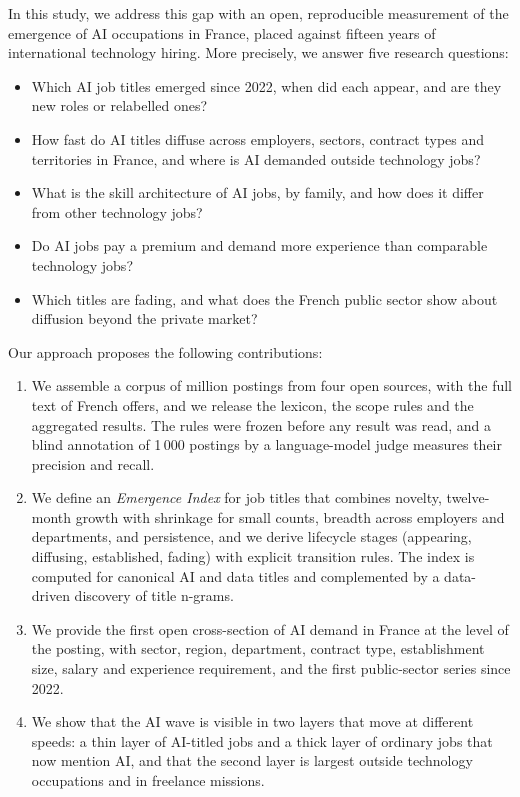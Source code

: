 \documentclass[3p,times,10pt,authoryear]{elsarticle}
\newcommand{\RQ}[1]{\textbf{RQ#1}}
\begin{document}
In this study, we address this gap with an open, reproducible measurement of the emergence of AI occupations in France, placed against fifteen years of international technology hiring. More precisely, we answer five research questions:
\begin{itemize}[leftmargin=2.6em]
\item[\RQ{1}] Which AI job titles emerged since 2022, when did each appear, and are they new roles or relabelled ones?
\item[\RQ{2}] How fast do AI titles diffuse across employers, sectors, contract types and territories in France, and where is AI demanded outside technology jobs?
\item[\RQ{3}] What is the skill architecture of AI jobs, by family, and how does it differ from other technology jobs?
\item[\RQ{4}] Do AI jobs pay a premium and demand more experience than comparable technology jobs?
\item[\RQ{5}] Which titles are fading, and what does the French public sector show about diffusion beyond the private market?
\end{itemize}

Our approach proposes the following contributions:
\begin{enumerate}
\item We assemble a corpus of \nAll{} million postings from four open sources, with the full text of \nFT{} French offers, and we release the lexicon, the scope rules and the aggregated results. The rules were frozen before any result was read, and a blind annotation of 1\,000 postings by a language-model judge measures their precision and recall.
\item We define an \emph{Emergence Index} for job titles that combines novelty, twelve-month growth with shrinkage for small counts, breadth across employers and departments, and persistence, and we derive lifecycle stages (appearing, diffusing, established, fading) with explicit transition rules. The index is computed for \nStages{} canonical AI and data titles and complemented by a data-driven discovery of title n-grams.
\item We provide the first open cross-section of AI demand in France at the level of the posting, with sector, region, department, contract type, establishment size, salary and experience requirement, and the first public-sector series since 2022.
\item We show that the AI wave is visible in two layers that move at different speeds: a thin layer of AI-titled jobs and a thick layer of ordinary jobs that now mention AI, and that the second layer is largest outside technology occupations and in freelance missions.
\end{enumerate}
\end{document}

